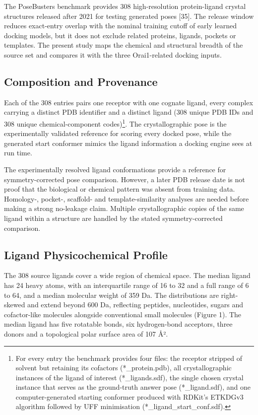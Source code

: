 The PoseBusters benchmark provides 308 high-resolution protein-ligand crystal structures released after 2021 for testing generated poses {[}35{]}. The release window reduces exact-entry overlap with the nominal training cutoff of early learned docking models, but it does not exclude related proteins, ligands, pockets or templates. The present study maps the chemical and structural breadth of the source set and compares it with the three Orai1-related docking inputs.

\hypertarget{composition-and-provenance}{%
\subsection{Composition and Provenance}\label{composition-and-provenance}}

Each of the 308 entries pairs one receptor with one cognate ligand, every complex carrying a distinct PDB identifier and a distinct ligand (308 unique PDB IDs and 308 unique chemical-component codes)\footnote{For every entry the benchmark provides four files: the receptor stripped of solvent but retaining its cofactors (*\_protein.pdb), all crystallographic instances of the ligand of interest (*\_ligands.sdf), the single chosen crystal instance that serves as the ground-truth answer pose (*\_ligand.sdf), and one computer-generated starting conformer produced with RDKit's ETKDGv3 algorithm followed by UFF minimisation (*\_ligand\_start\_conf.sdf).}. The crystallographic pose is the experimentally validated reference for scoring every docked pose, while the generated start conformer mimics the ligand information a docking engine sees at run time.

The experimentally resolved ligand conformations provide a reference for symmetry-corrected pose comparison. However, a later PDB release date is not proof that the biological or chemical pattern was absent from training data. Homology-, pocket-, scaffold- and template-similarity analyses are needed before making a strong no-leakage claim. Multiple crystallographic copies of the same ligand within a structure are handled by the stated symmetry-corrected comparison.

\hypertarget{ligand-physicochemical-profile}{%
\subsection{Ligand Physicochemical Profile}\label{ligand-physicochemical-profile}}

The 308 source ligands cover a wide region of chemical space. The median ligand has 24 heavy atoms, with an interquartile range of 16 to 32 and a full range of 6 to 64, and a median molecular weight of 359 Da. The distributions are right-skewed and extend beyond 600 Da, reflecting peptides, nucleotides, sugars and cofactor-like molecules alongside conventional small molecules (Figure 1). The median ligand has five rotatable bonds, six hydrogen-bond acceptors, three donors and a topological polar surface area of 107 Å².

